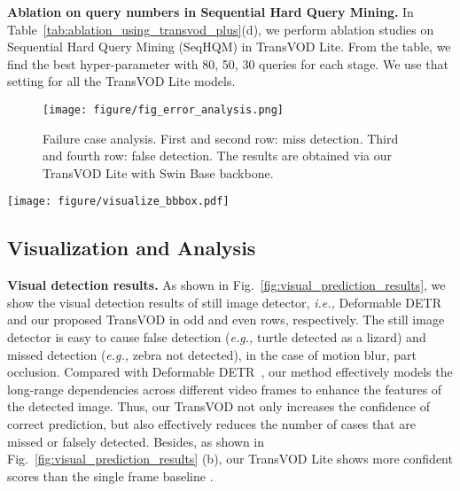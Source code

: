 \documentclass[10pt,journal,compsoc]{IEEEtran}
\begin{document}
\noindent
\textbf{Ablation on query numbers in Sequential Hard Query Mining.} In Table~\ref{tab:ablation_using_transvod_plus}(d), we perform ablation studies on Sequential Hard Query Mining (SeqHQM) in TransVOD Lite. From the table, we find the best hyper-parameter with 80, 50, 30 queries for each stage. We use that setting for all the TransVOD Lite models.


\begin{figure}[t]
    \centering
    \texttt{[image: figure/fig\_error\_analysis.png]} 
    \caption{\small Failure case analysis. First and second row: miss detection. Third and fourth row: false detection. The results are obtained via our TransVOD Lite with Swin Base backbone.
    }
    \label{fig:failure_cases}
\end{figure}

\begin{figure*}[h]
    \centering
    \texttt{[image: figure/visualize\_bbbox.pdf]} 
    \vspace{-3mm}
    \caption{\small The visualization results of single frame baseline method~\cite{zhu2020deformable} and TransVOD (a), TransVOD Lite (b) in different scenarios. Compared with single frame baseline, our proposed TransVOD and TransVOD lite show better and consistent detection results in the cases of part occlusion (top two rows of (a) and (b)), motion blur (middle two rows of (a) and (b)) and rare pose (last two rows of (a) and (b)), respectively. Best view it on the screen and zoom in.}
    \label{fig:visual_prediction_results}
    \vspace{-5mm}
\end{figure*}


\subsection{Visualization and Analysis}

\noindent \textbf{Visual detection results.} As shown in Fig.~\ref{fig:visual_prediction_results}, we show the visual detection results of still image detector, \emph{i.e.,} Deformable DETR~\cite{zhu2020deformable} and our proposed TransVOD in odd and even rows, respectively. The still image detector is easy to cause false detection (\emph{e.g.,} turtle detected as a lizard) and missed detection (\emph{e.g.,} zebra not detected), in the case of motion blur, part occlusion. Compared with Deformable DETR~\cite{zhu2020deformable}, our method effectively models the long-range dependencies across different video frames to enhance the features of the detected image. Thus, our TransVOD not only increases the confidence of correct prediction, but also effectively reduces the number of cases that are missed or falsely detected. Besides, as shown in Fig.~\ref{fig:visual_prediction_results} (b), our TransVOD Lite shows more confident scores than the single frame baseline \cite{zhu2020deformable}.
\end{document}
